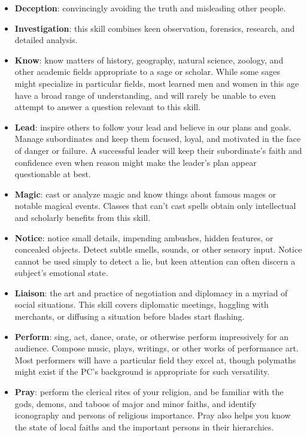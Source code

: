 \documentclass[itdr/core]{subfiles}
\begin{document}
\begin{itemize}
\item \textbf{Deception}: convincingly avoiding the truth and misleading other people.

\item \textbf{Investigation}: this skill combines keen observation, forensics, research, and detailed analysis.

\item \textbf{Know}: know matters of history, geography, natural science, zoology, and other academic fields appropriate to a sage or scholar. While some sages might specialize in particular fields, most learned men and women in this age have a broad range of understanding, and will rarely be unable to even attempt to answer a question relevant to this skill.

\item \textbf{Lead}: inspire others to follow your lead and believe in our plans and goals. Manage subordinates and keep them focused, loyal, and motivated in the face of danger or failure. A successful leader will keep their subordinate’s faith and confidence even when reason might make the leader’s plan appear questionable at best.

\item \textbf{Magic}: cast or analyze magic and know things about famous mages or notable magical events. Classes that can’t cast spells obtain only intellectual and scholarly benefits from this skill.

\item \textbf{Notice}: notice small details, impending ambushes, hidden features, or concealed objects. Detect subtle smells, sounds, or other sensory input. Notice cannot be used simply to detect a lie, but keen attention can often discern a subject’s emotional state.

\item \textbf{Liaison}: the art and practice of negotiation and diplomacy in a myriad of social situations. This skill covers diplomatic meetings, haggling with merchants, or diffusing a situation before blades start flashing.

\item \textbf{Perform}: sing, act, dance, orate, or otherwise perform impressively for an audience. Compose music, plays, writings, or other works of performance art. Most performers will have a particular field they excel at, though polymaths might exist if the PC’s background is appropriate for such versatility.

\item \textbf{Pray}: perform the clerical rites of your religion, and be familiar with the gods, demons, and taboos of major and minor faiths, and identify iconography and persons of religious importance. Pray also helps you know the state of local faiths and the important persons in their hierarchies.


\end{itemize}
\end{document}
